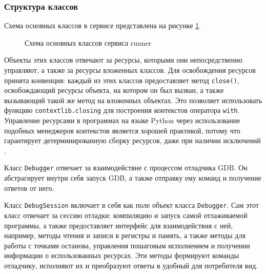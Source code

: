 \documentclass[a4paper,article,14pt]{extarticle}
\begin{document}
\subsubsection{Структура классов}

Схема основных классов в сервисе представлена на рисунке \ref{fig:runner_classes}.

\begin{figure}[ht]
    \begin{center}
        \caption{\label{fig:runner_classes} Схема основных классов сервиса runner}
    \end{center}
\end{figure}

Объекты этих классов отвечают за ресурсы, которыми они непосредственно управляют, а также за ресурсы вложенных классов. Для освобождения ресурсов принята конвенция: каждый из этих классов предоставляет метод \texttt{close()}, освобождающий ресурсы объекта, на котором он был вызван, а также вызывающий такой же метод на вложенных объектах. Это позволяет использовать функцию \texttt{contextlib.closing} для построения контекстов оператора \texttt{with}. Управление ресурсами в программах на языке Python через использование подобных менеджеров контекстов является хорошей практикой, потому что гарантирует детерминированную сборку ресурсов, даже при наличии исключений \cite{fluentpython}.

Класс \texttt{Debugger} отвечает за взаимодействие с процессом отладчика GDB. Он абстрагирует внутри себя запуск GDB, а также отправку ему команд и получение ответов от него.

Класс \texttt{DebugSession} включает в себя как поле объект класса \texttt{Debugger}. Сам этот класс отвечает за сессию отладки: компиляцию и запуск самой отлаживаемой программы, а также предоставляет интерфейс для взаимодействия с ней, например, методы чтения и записи в регистры и память, а также методы для работы с точками останова, управления пошаговым исполнением и получении информации о использованных ресурсах. Эти методы формируют команды отладчику, исполняют их и преобразуют ответы в удобный для потребителя вид.
\end{document}
